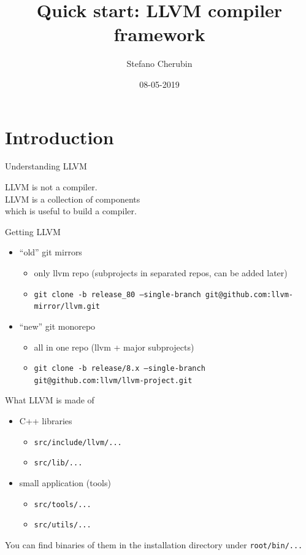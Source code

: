 \documentclass[10pt,mathserif]{beamer}
\author{Stefano Cherubin}
\institute{Politecnico di Milano}
\date{08-05-2019}
\title{Quick start: LLVM compiler framework}
\begin{document}
\begin{frame}
\maketitle
\end{frame}

\section{Introduction}
\begin{frame}{Understanding LLVM}
	\begin{center}
	\huge{
		LLVM is not a compiler.\\
		\pause
		\vfill
		LLVM is a collection of components\\
		which is useful to build a compiler.
	}
	\end{center}
\end{frame}

\begin{frame}{Getting LLVM}
\begin{itemize}
	\item ``old'' git mirrors
		\begin{itemize}
			\item only llvm repo (subprojects in separated repos, can be added later)
			\item \texttt{git clone -b release\_80 --single-branch git@github.com:llvm-mirror/llvm.git}
		\end{itemize}
	\vfill
	\item ``new'' git monorepo
		\begin{itemize}
			\item all in one repo (llvm + major subprojects)
			\item \texttt{git clone -b release/8.x --single-branch git@github.com:llvm/llvm-project.git}
		\end{itemize}
\end{itemize}
\end{frame}

\begin{frame}{What LLVM is made of}
\begin{itemize}
	\item C++ libraries
		\begin{itemize}
			\item \texttt{src/include/llvm/...}
			\item \texttt{src/lib/...}
		\end{itemize}
		\vfill
	\item small application (tools)
		\begin{itemize}
			\item \texttt{src/tools/...}
			\item \texttt{src/utils/...}
		\end{itemize}
\end{itemize}
\vfill
You can find binaries of them in the installation directory under \texttt{root/bin/...}
\end{frame}
\end{document}
